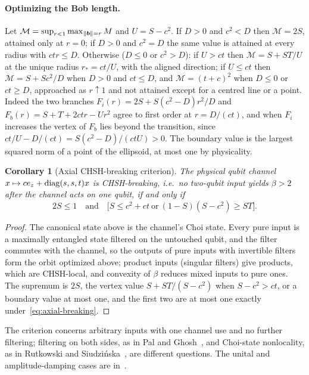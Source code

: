 \documentclass[11pt]{article}
\newtheorem{corollary}[theorem]{Corollary}
\theoremstyle{remark}\newtheorem{remark}[theorem]{Remark}
\newcommand{\norm}[1]{\left\lVert#1\right\rVert}
\begin{document}
\paragraph{Optimizing the Bob length.}
Let $\mathcal M=\sup_{r<1}\max_{\norm{\bv}=r}M$ and $U=S-c^2$. If $D>0$ and
$c^2<D$ then $\mathcal M=2S$, attained only at $r=0$; if $D>0$ and $c^2=D$ the
same value is attained at every radius with $ctr\le D$. Otherwise ($D\le0$ or
$c^2>D$): if $U>ct$ then $\mathcal M=S+ST/U$ at the unique radius
$r_*=ct/U$, with the aligned direction; if $U\le ct$ then
$\mathcal M=S+Sc^2/D$ when $D>0$ and $ct\le D$, and $\mathcal M=(t+c)^2$ when
$D\le0$ or $ct\ge D$, approached as $r\uparrow1$ and not attained except for a
centred line or a point. Indeed the two branches
$F_i(r)=2S+S(c^2-D)r^2/D$ and $F_b(r)=S+T+2ctr-Ur^2$ agree to first order at
$r=D/(ct)$, and when $F_i$ increases the vertex of $F_b$ lies beyond the
transition, since $ct/U-D/(ct)=S(c^2-D)/(ctU)>0$. The boundary value is the
largest squared norm of a point of the ellipsoid, at most one by physicality.

\begin{corollary}[Axial CHSH-breaking criterion]\label{cor:channel}
The physical qubit channel $x\mapsto ce_z+\operatorname{diag}(s,s,t)x$ is CHSH-breaking,
i.e.\ no two-qubit input yields $\beta>2$ after the channel acts on one qubit,
if and only if
\begin{equation}\label{eq:axial-breaking}
 2S\le1\quad\text{and}\quad\bigl[S\le c^2+ct\ \text{or}\ (1-S)(S-c^2)\ge ST\bigr].
\end{equation}
\end{corollary}
\begin{proof}
The canonical state above is the channel's Choi state. Every pure input is a
maximally entangled state filtered on the untouched qubit, and the filter
commutes with the channel, so the outputs of pure inputs with invertible
filters form the orbit optimized above; product inputs (singular filters) give
products, which are CHSH-local, and convexity of $\beta$ reduces mixed inputs
to pure ones. The supremum is $2S$, the vertex value $S+ST/(S-c^2)$ when
$S-c^2>ct$, or a boundary value at most one, and the first two are at most one
exactly under~\eqref{eq:axial-breaking}.
\end{proof}
The criterion concerns arbitrary inputs with one channel use and no further
filtering; filtering on both sides, as in Pal and Ghosh~\cite{pal}, and
Choi-state nonlocality, as in Rutkowski and Siudzi\'nska~\cite{rutkowski}, are
different questions. The unital and amplitude-damping cases are
in~\cite{pal,zhang}.
\end{document}
